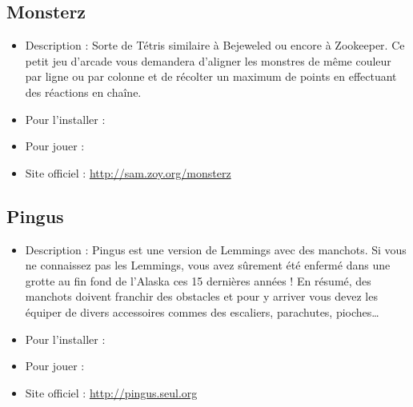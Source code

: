 \subsection{Monsterz}
\begin{itemize}
\begingroup
{}
\item Description : Sorte de Tétris similaire à Bejeweled ou encore à Zookeeper. Ce petit jeu d'arcade vous demandera d'aligner les monstres de même couleur par ligne ou par colonne et de récolter un maximum de points en effectuant des réactions en chaîne.{\par}
\item Pour l'installer : 
\item Pour jouer : 
\item Site officiel : \url{http://sam.zoy.org/monsterz}{\par}
\endgroup
\end{itemize}
\subsection{Pingus}
\begin{itemize}
\begingroup
{}
\item Description : Pingus est une version de Lemmings avec des manchots. Si vous ne connaissez pas les Lemmings, vous avez sûrement été enfermé dans une grotte au fin fond de l'Alaska ces 15 dernières années ! En résumé, des manchots doivent franchir des obstacles et pour y arriver vous devez les équiper de divers accessoires commes des escaliers, parachutes, pioches\ldots{}{\par}
\item Pour l'installer : 
\item Pour jouer : 
\item Site officiel : \url{http://pingus.seul.org}{\par}
\endgroup
\end{itemize}
\newpage
